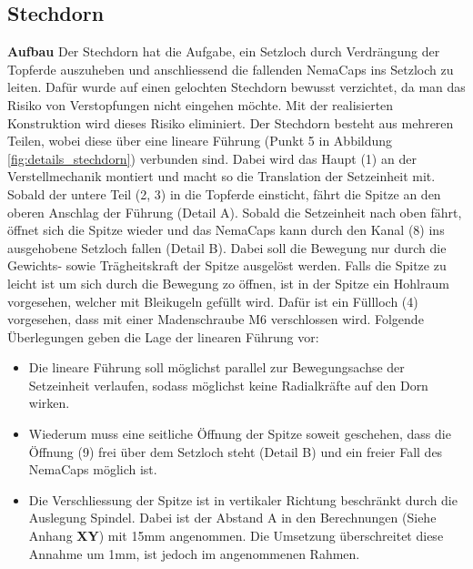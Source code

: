 \subsection{Stechdorn}

\textbf{Aufbau}
Der Stechdorn hat die Aufgabe, ein Setzloch durch Verdrängung der Topferde auszuheben und anschliessend die fallenden NemaCaps ins Setzloch zu leiten. Dafür wurde auf einen gelochten Stechdorn bewusst verzichtet, da man das Risiko von Verstopfungen nicht eingehen möchte. Mit der realisierten Konstruktion wird dieses Risiko eliminiert. 
\newline
Der Stechdorn besteht aus mehreren Teilen, wobei diese über eine lineare Führung (Punkt 5 in Abbildung \ref{fig:details_stechdorn}) verbunden sind. Dabei wird das Haupt (1) an der Verstellmechanik montiert und macht so die Translation der Setzeinheit mit. Sobald der untere Teil (2, 3) in die Topferde einsticht, fährt die Spitze an den oberen Anschlag der Führung (Detail A). Sobald die Setzeinheit nach oben fährt, öffnet sich die Spitze wieder und das NemaCaps kann durch den Kanal (8) ins ausgehobene Setzloch fallen (Detail B). Dabei soll die Bewegung nur durch die Gewichts- sowie Trägheitskraft der Spitze ausgelöst werden. Falls die Spitze zu leicht ist um sich durch die Bewegung zo öffnen, ist in der Spitze ein Hohlraum vorgesehen, welcher mit Bleikugeln gefüllt wird. Dafür ist ein Füllloch (4) vorgesehen, dass mit einer Madenschraube M6 verschlossen wird.
\newline
Folgende Überlegungen geben die Lage der linearen Führung vor:
\begin{itemize}
	\item Die lineare Führung soll möglichst parallel zur Bewegungsachse der Setzeinheit verlaufen, sodass möglichst keine Radialkräfte auf den Dorn wirken.
	
	\item Wiederum muss eine seitliche Öffnung der Spitze soweit geschehen, dass die Öffnung (9) frei über dem Setzloch steht (Detail B) und ein freier Fall des NemaCaps möglich ist.
	
	\item Die Verschliessung der Spitze ist in vertikaler Richtung beschränkt durch die Auslegung Spindel. Dabei ist der Abstand A in den Berechnungen (Siehe Anhang \textbf{XY}) mit 15mm angenommen. Die Umsetzung überschreitet diese Annahme um 1mm, ist jedoch im angenommenen Rahmen.
\end{itemize}

